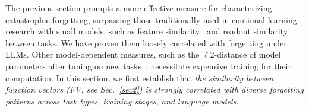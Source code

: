 The previous section prompts a more effective measure for characterizing catastrophic forgetting, surpassing those traditionally used in continual learning research with small models, such as 
feature similarity~\citep{ramasesh2020anatomy,lee2021continual} and readout similarity~\citep{lee2021continual} between tasks. %
We have proven them loosely correlated with forgetting under LLMs. 
Other model-dependent measures, such as the $\ell$2-distance of model parameters after tuning on new tasks~\citep{lin2023theory, evron2024joint}, necessitate expensive training for their computation. 
In this section, we first establish that \emph{the similarity between function vectors (FV, see Sec.~\ref{sec2}) is strongly correlated with diverse forgetting patterns across task types, training stages, and language models}. 



